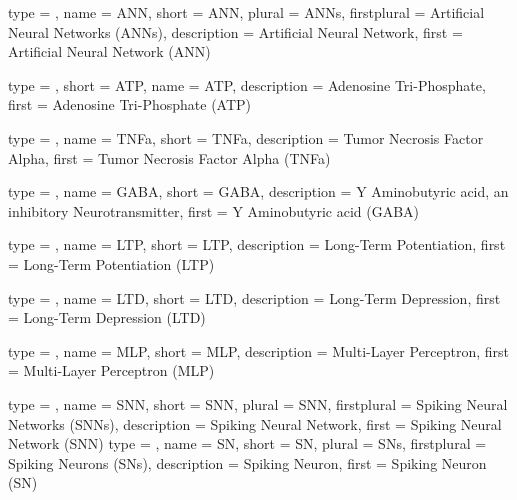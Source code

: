 %
%
%


{
	type        = \acronymtype,
	name        = {ANN},
	short       = {ANN},
	plural      = ANNs,
	firstplural = Artificial Neural Networks (ANNs),
	description = {Artificial Neural Network},
	first       = {Artificial Neural Network (ANN)}
}

{
	type        = \acronymtype,
	short       = {ATP},
  	name        = {ATP},
	description = {Adenosine Tri-Phosphate},
	first       = {Adenosine Tri-Phosphate (ATP)}
}

{
	type        = \acronymtype,
   	name        = {TNFa},
	short       = {TNFa},
	description = {Tumor Necrosis Factor Alpha},
	first       = {Tumor Necrosis Factor Alpha (TNFa)}
}

{
    type        = \acronymtype,
	name        = {GABA},
  	short       = {GABA},
	description = {Y Aminobutyric acid, an inhibitory Neurotransmitter},
	first       = {Y Aminobutyric acid (GABA)}
}

{
	type        = \acronymtype,
	name        = {LTP},
	short       = {LTP},
	description = {Long-Term Potentiation},
	first       = {Long-Term Potentiation (LTP)}
}

{
	type        = \acronymtype,
	name        = {LTD},
	short       = {LTD},
	description = {Long-Term Depression},
	first       = {Long-Term Depression (LTD)}
}

{
	type        = \acronymtype,
	name        = {MLP},
	short       = {MLP},
	description = {Multi-Layer Perceptron},
	first       = {Multi-Layer Perceptron (MLP)}
}

{
	type        = \acronymtype,
	name        = {SNN},
	short       = {SNN},
	plural      = SNN,
	firstplural = Spiking Neural Networks (SNNs),
	description = {Spiking Neural Network},
	first       = {Spiking Neural Network (SNN)}
}
{
	type        = \acronymtype,
	name        = {SN},
	short       = {SN},
	plural      = SNs,
	firstplural = Spiking Neurons (SNs),
	description = {Spiking Neuron},
	first       = {Spiking Neuron (SN)}
}

